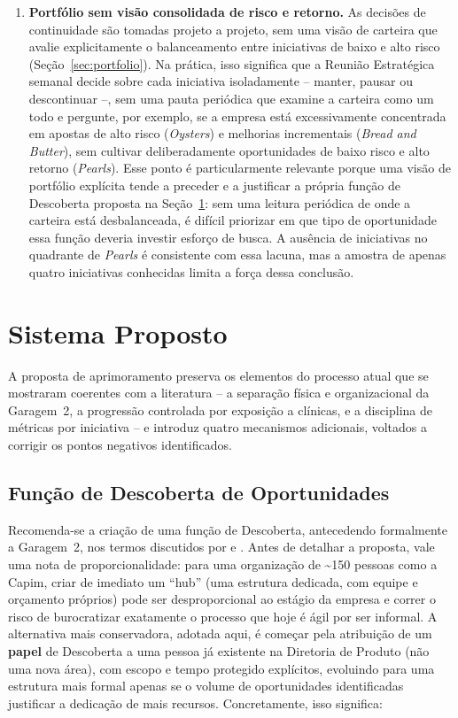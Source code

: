 \begin{enumerate}
  \item \textbf{Portfólio sem visão consolidada de risco e retorno.} As decisões de continuidade são tomadas projeto a projeto, sem uma visão de carteira que avalie explicitamente o balanceamento entre iniciativas de baixo e alto risco (Seção~\ref{sec:portfolio}). Na prática, isso significa que a Reunião Estratégica semanal decide sobre cada iniciativa isoladamente -- manter, pausar ou descontinuar --, sem uma pauta periódica que examine a carteira como um todo e pergunte, por exemplo, se a empresa está excessivamente concentrada em apostas de alto risco (\textit{Oysters}) e melhorias incrementais (\textit{Bread and Butter}), sem cultivar deliberadamente oportunidades de baixo risco e alto retorno (\textit{Pearls}). Esse ponto é particularmente relevante porque uma visão de portfólio explícita tende a preceder e a justificar a própria função de Descoberta proposta na Seção~\ref{sec:sistema-proposto}: sem uma leitura periódica de onde a carteira está desbalanceada, é difícil priorizar em que tipo de oportunidade essa função deveria investir esforço de busca. A ausência de iniciativas no quadrante de \textit{Pearls} é consistente com essa lacuna, mas a amostra de apenas quatro iniciativas conhecidas limita a força dessa conclusão.
\end{enumerate}

\section{Sistema Proposto}
\label{sec:sistema-proposto}

A proposta de aprimoramento preserva os elementos do processo atual que se mostraram coerentes com a literatura -- a separação física e organizacional da Garagem~2, a progressão controlada por exposição a clínicas, e a disciplina de métricas por iniciativa -- e introduz quatro mecanismos adicionais, voltados a corrigir os pontos negativos identificados.

\subsection{Função de Descoberta de Oportunidades}

Recomenda-se a criação de uma função de Descoberta, antecedendo formalmente a Garagem~2, nos termos discutidos por \textcite{salernogomes2018} e \textcite{oconnormeyer2026}. Antes de detalhar a proposta, vale uma nota de proporcionalidade: para uma organização de \textasciitilde150 pessoas como a Capim, criar de imediato um ``hub'' (uma estrutura dedicada, com equipe e orçamento próprios) pode ser desproporcional ao estágio da empresa e correr o risco de burocratizar exatamente o processo que hoje é ágil por ser informal. A alternativa mais conservadora, adotada aqui, é começar pela atribuição de um \textbf{papel} de Descoberta a uma pessoa já existente na Diretoria de Produto (não uma nova área), com escopo e tempo protegido explícitos, evoluindo para uma estrutura mais formal apenas se o volume de oportunidades identificadas justificar a dedicação de mais recursos. Concretamente, isso significa:

